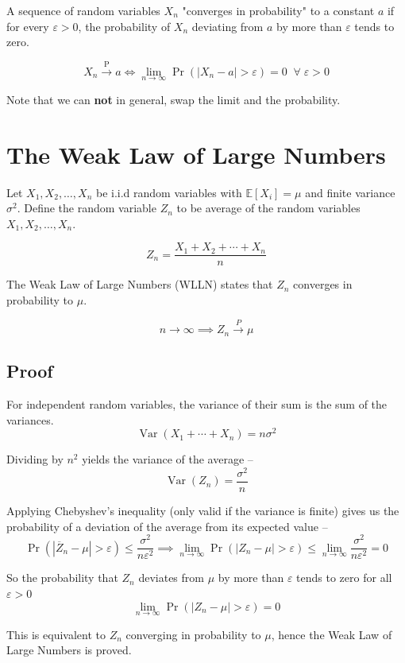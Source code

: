 A sequence of random variables \(X_n\) "converges in probability" to a constant \(a\) if 
for every $\varepsilon>0$, the probability of $X_n$ deviating from $a$ by more than $\varepsilon$ tends to zero. 

\[
X_n \xrightarrow{\mathrm{P}} a \iff \lim_{n\to\infty} \Pr(|X_n-a|>\varepsilon)=0 \;\; \forall \; \varepsilon>0
\]

Note that we can \textbf{not} in general, swap the limit and the probability. 

\section{The Weak Law of Large Numbers}

Let $X_1,X_2,\ldots,X_n$ be i.i.d random variables with $\mathbb E[X_i]=\mu$ and finite variance $\sigma^2$.
Define the random variable $Z_n$ to be average of the random variables $X_1,X_2,\ldots,X_n$.

\[
Z_n = \frac{X_1+X_2+\cdots+X_n}{n}
\]

\noindent The Weak Law of Large Numbers (WLLN) states that $Z_n$ converges in probability to $\mu$.

\[
n \to \infty \implies Z_n
\xrightarrow{P}
\mu
\]

\subsection*{Proof}
For independent random variables, the variance of their sum is the sum of the variances.
\[
\operatorname{Var}(X_1+\cdots+X_n)
=
n\sigma^2
\]

\noindent Dividing by \(n^2\) yields the variance of the average --
\[
\operatorname{Var}(Z_n)
=
\frac{\sigma^2}{n}
\]

\noindent Applying Chebyshev's inequality (only valid if the variance is finite) gives us the 
probability of a deviation of the average from its expected value --
\[
\Pr(|\overline Z_n-\mu|>\varepsilon)
\le
\frac{\sigma^2}{n\varepsilon^2}
\implies \lim\limits_{n\to\infty}\Pr(|Z_n-\mu|>\varepsilon) \le \lim\limits_{n\to\infty}\frac{\sigma^2}{n\varepsilon^2}=0
\]

So the probability that $Z_n$ deviates from $\mu$ by more than $\varepsilon$ tends to zero 
for all $\varepsilon > 0$
\[
\lim\limits_{n\to\infty}\Pr(|Z_n-\mu|>\varepsilon)=0
\]

This is equivalent to $Z_n$ converging in probability to $\mu$, hence 
the Weak Law of Large Numbers is proved.


